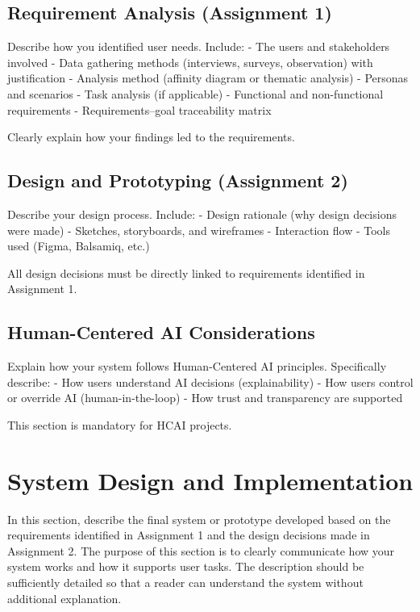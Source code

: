 \documentclass[sigconf]{acmart}
\begin{document}
\subsection{Requirement Analysis (Assignment 1)}

Describe how you identified user needs. Include:
- The users and stakeholders involved
- Data gathering methods (interviews, surveys, observation) with justification
- Analysis method (affinity diagram or thematic analysis)
- Personas and scenarios
- Task analysis (if applicable)
- Functional and non-functional requirements
- Requirements–goal traceability matrix

Clearly explain how your findings led to the requirements.

\subsection{Design and Prototyping (Assignment 2)}

Describe your design process. Include:
- Design rationale (why design decisions were made)
- Sketches, storyboards, and wireframes
- Interaction flow
- Tools used (Figma, Balsamiq, etc.)

All design decisions must be directly linked to requirements identified in Assignment 1.

\subsection{Human-Centered AI Considerations}

Explain how your system follows Human-Centered AI principles. Specifically describe:
- How users understand AI decisions (explainability)
- How users control or override AI (human-in-the-loop)
- How trust and transparency are supported

This section is mandatory for HCAI projects.

\section{System Design and Implementation}

In this section, describe the final system or prototype developed based on the requirements identified in Assignment 1 and the design decisions made in Assignment 2. The purpose of this section is to clearly communicate how your system works and how it supports user tasks. The description should be sufficiently detailed so that a reader can understand the system without additional explanation.
\end{document}
